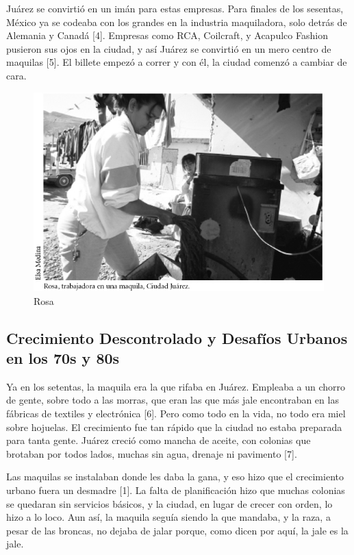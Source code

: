 \documentclass[
  10pt,
  letterpaper,
]{book}
\begin{document}
Juárez se convirtió en un imán para estas empresas. Para finales de los
sesentas, México ya se codeaba con los grandes en la industria
maquiladora, solo detrás de Alemania y Canadá {[}4{]}. Empresas como
RCA, Coilcraft, y Acapulco Fashion pusieron sus ojos en la ciudad, y así
Juárez se convirtió en un mero centro de maquilas {[}5{]}. El billete
empezó a correr y con él, la ciudad comenzó a cambiar de cara.

\begin{figure}[H]

{\centering \includegraphics{Img/Rosa.jpg}

}

\caption{Rosa}

\end{figure}%

\subsection{Crecimiento Descontrolado y Desafíos Urbanos en los 70s y
80s}\label{crecimiento-descontrolado-y-desafuxedos-urbanos-en-los-70s-y-80s}

Ya en los setentas, la maquila era la que rifaba en Juárez. Empleaba a
un chorro de gente, sobre todo a las morras, que eran las que más jale
encontraban en las fábricas de textiles y electrónica {[}6{]}. Pero como
todo en la vida, no todo era miel sobre hojuelas. El crecimiento fue tan
rápido que la ciudad no estaba preparada para tanta gente. Juárez creció
como mancha de aceite, con colonias que brotaban por todos lados, muchas
sin agua, drenaje ni pavimento {[}7{]}.

Las maquilas se instalaban donde les daba la gana, y eso hizo que el
crecimiento urbano fuera un desmadre {[}1{]}. La falta de planificación
hizo que muchas colonias se quedaran sin servicios básicos, y la ciudad,
en lugar de crecer con orden, lo hizo a lo loco. Aun así, la maquila
seguía siendo la que mandaba, y la raza, a pesar de las broncas, no
dejaba de jalar porque, como dicen por aquí, la jale es la jale.
\end{document}
